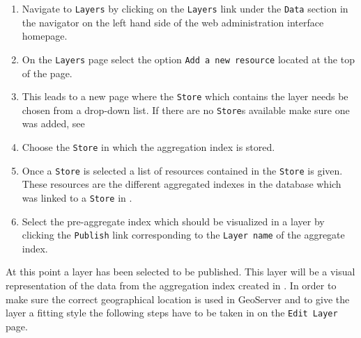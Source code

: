 \begin{enumerate}
	\item Navigate to \lstinline|Layers| by clicking on the \lstinline|Layers| link under the \lstinline|Data| section in the navigator on the left hand side of the web administration interface homepage.
	\item On the \lstinline|Layers| page select the option \lstinline|Add a new resource| located at the top of the page.
	\item This leads to a new page where the \lstinline|Store| which contains the layer needs be chosen from a drop-down list. If there are no \lstinline|Store|s available make sure one was added, see  
	\item Choose the \lstinline|Store| in which the aggregation index is stored.
	\item Once a \lstinline|Store| is selected a list of resources contained in the \lstinline|Store| is given. These resources are the different aggregated indexes in the database which was linked to a \lstinline|Store| in .
	\item Select the pre-aggregate index which should be visualized in a layer by clicking the \lstinline|Publish| link corresponding to the \lstinline|Layer name| of the aggregate index.
\end{enumerate}

\noindent At this point a layer has been selected to be published. This
layer will be a visual representation of the data from the aggregation
index created in . In order to make sure the correct
geographical location is used in GeoServer and to give the layer a fitting
style the following steps have to be taken in on the \lstinline|Edit Layer|
page.

